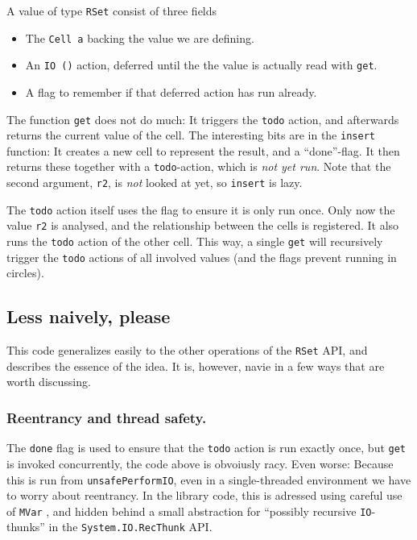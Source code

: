 \documentclass[manuscript,screen,acmsmall]{acmart}
\begin{document}
A value of type \verb|RSet| consist of three fields
\begin{itemize}
\item The \verb|Cell a| backing the value we are defining.
\item An \verb|IO ()| action, deferred until the the value is actually read with \verb|get|.
\item A flag to remember if that deferred action has run already.
\end{itemize}

The function \verb|get| does not do much: It triggers the \verb|todo| action, and afterwards returns the current value of the cell. The interesting bits are in the \verb|insert| function: It creates a new cell to represent the result, and a “done”-flag. It then returns these together with a \verb|todo|-action, which is \emph{not yet run}. Note that the second argument, \verb|r2|, is \emph{not} looked at yet, so \verb|insert| is lazy.

The \verb|todo| action itself uses the flag to ensure it is only run once. Only now the value \verb|r2| is analysed, and the relationship between the cells is registered. It also runs the \verb|todo| action of the other cell. This way, a single \verb|get| will recursively trigger the \verb|todo| actions of all involved values (and the flags prevent running in circles).

\subsection{Less naively, please}

This code generalizes easily to the other operations of the \verb|RSet| API, and describes the essence of the idea. It is, however, navie in a few ways that are worth discussing.

\subsubsection{Reentrancy and thread safety.}\label{sec:thread}

The \verb|done| flag is used to ensure that the \verb|todo| action is run exactly once, but \verb|get| is invoked concurrently, the code above is obvoiusly racy. Even worse: Because this is run from \verb|unsafePerformIO|, even in a single-threaded environment we have to worry about reentrancy. In the library code, this is adressed using careful use of \verb|MVar| \cite{concurrent}, and hidden behind a small abstraction for “possibly recursive \verb|IO|-thunks” in the \verb|System.IO.RecThunk| API.
\end{document}
